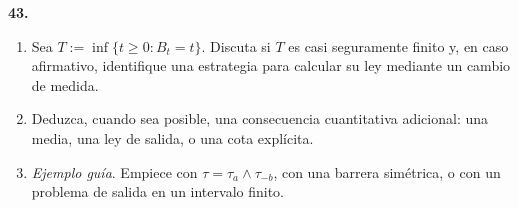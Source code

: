 \documentclass[11pt, letterpaper]{article}
\begin{document}
\newpage

\begin{ejercicio}
    \textbf{43.} 
    \begin{enumerate}
        \item Sea $T := \inf\{t \ge 0 : B_t = t\}$. Discuta si $T$ es casi seguramente finito y, en caso afirmativo, identifique una estrategia para calcular su ley mediante un cambio de medida.
        \item Deduzca, cuando sea posible, una consecuencia cuantitativa adicional: una media, una ley de salida, o una cota explícita.
        \item \textit{Ejemplo guía}. Empiece con $\tau = \tau_a \wedge \tau_{-b}$, con una barrera simétrica, o con un problema de salida en un intervalo finito.
    \end{enumerate}
\end{ejercicio}

\vspace{5mm}
\end{document}
